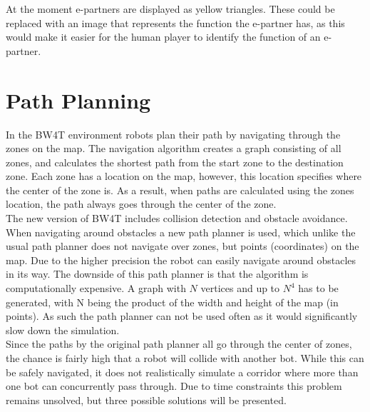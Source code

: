 At the moment e-partners are displayed as yellow triangles. These could be replaced with an image that represents the function the e-partner has, as this would make it easier for the human player to identify the function of an e-partner.
\section{Path Planning}
In the BW4T environment robots plan their path by navigating through the zones on the map. The navigation algorithm creates a graph consisting of all zones, and calculates the shortest path from the start zone to the destination zone. Each zone has a location on the map, however, this location specifies where the center of the zone is. As a result, when paths are calculated using the zones location, the path always goes through the center of the zone. \\
The new version of BW4T includes collision detection and obstacle avoidance. When navigating around obstacles a new path planner is used, which unlike the usual path planner does not navigate over zones, but points (coordinates) on the map. Due to the higher precision the robot can easily navigate around obstacles in its way. The downside of this path planner is that the algorithm is computationally expensive. A graph with $N$ vertices and up to $N^4$ has to be generated, with N being the product of the width and height of the map (in points). As such the path planner can not be used often as it would significantly slow down the simulation. \\
Since the paths by the original path planner all go through the center of zones, the chance is fairly high that a robot will collide with another bot. While this can be safely navigated, it does not realistically simulate a corridor where more than one bot can concurrently pass through. Due to time constraints this problem remains unsolved, but three possible solutions will be presented. \\

